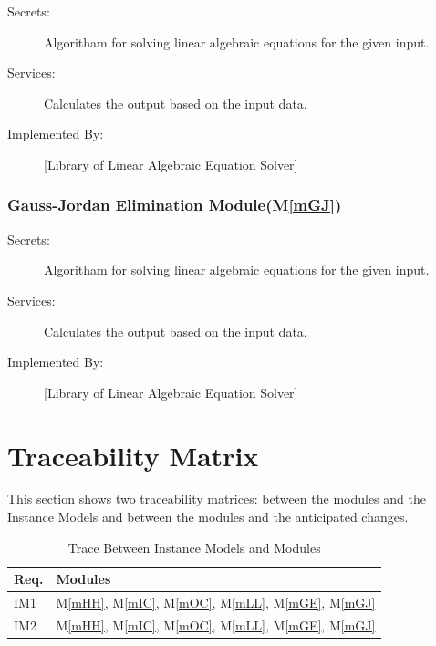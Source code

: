 \documentclass[12pt, titlepage]{article}
\newcommand{\mref}[1]{M\ref{#1}}
\begin{document}
\begin{description}
\item[Secrets:]Algoritham for solving linear algebraic equations for the given input.
\item[Services:]Calculates the output based on the input data.
\item[Implemented By:] [Library of Linear Algebraic Equation Solver]
\end{description}

\subsubsection{Gauss-Jordan Elimination Module(\mref{mGJ})}

\begin{description}
\item[Secrets:]Algoritham for solving linear algebraic equations for the given input.
\item[Services:]Calculates the output based on the input data.
\item[Implemented By:] [Library of Linear Algebraic Equation Solver]
\end{description}



\section{Traceability Matrix} \label{SecTM}

This section shows two traceability matrices: between the modules and the
Instance Models and between the modules and the anticipated changes.

\begin{table}[H]
\centering
\begin{tabular}{p{} p{}}
\toprule
\textbf{Req.} & \textbf{Modules}\\
\midrule


IM1 & \mref{mHH}, \mref{mIC}, \mref{mOC}, \mref{mLL}, \mref{mGE}, \mref{mGJ}\\
IM2 & \mref{mHH}, \mref{mIC}, \mref{mOC}, \mref{mLL}, \mref{mGE}, \mref{mGJ}\\

\bottomrule
\end{tabular}
\caption{Trace Between Instance Models and Modules}
\label{TblRT}
\end{table}
\end{document}
